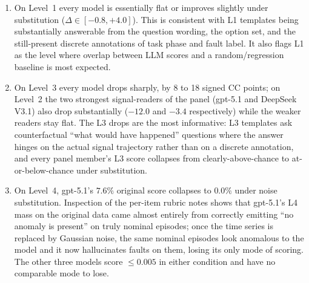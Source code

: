 \begin{enumerate}
    \item On Level~1 every model is essentially flat or improves slightly under substitution ($\Delta \in [-0.8, +4.0]$). This is consistent with L1 templates being substantially answerable from the question wording, the option set, and the still-present discrete annotations of task phase and fault label. It also flags L1 as the level where overlap between LLM scores and a random/regression baseline is most expected.
    \item On Level~3 every model drops sharply, by 8 to 18 signed CC points; on Level~2 the two strongest signal-readers of the panel (gpt-5.1 and DeepSeek V3.1) also drop substantially ($-12.0$ and $-3.4$ respectively) while the weaker readers stay flat. The L3 drops are the most informative: L3 templates ask counterfactual ``what would have happened'' questions where the answer hinges on the actual signal trajectory rather than on a discrete annotation, and every panel member's L3 score collapses from clearly-above-chance to at-or-below-chance under substitution.
    \item On Level~4, gpt-5.1's $7.6\%$ original score collapses to $0.0\%$ under noise substitution. Inspection of the per-item rubric notes shows that gpt-5.1's L4 mass on the original data came almost entirely from correctly emitting ``no anomaly is present'' on truly nominal episodes; once the time series is replaced by Gaussian noise, the same nominal episodes look anomalous to the model and it now hallucinates faults on them, losing its only mode of scoring. The other three models score $\leq 0.005$ in either condition and have no comparable mode to lose.
\end{enumerate}


